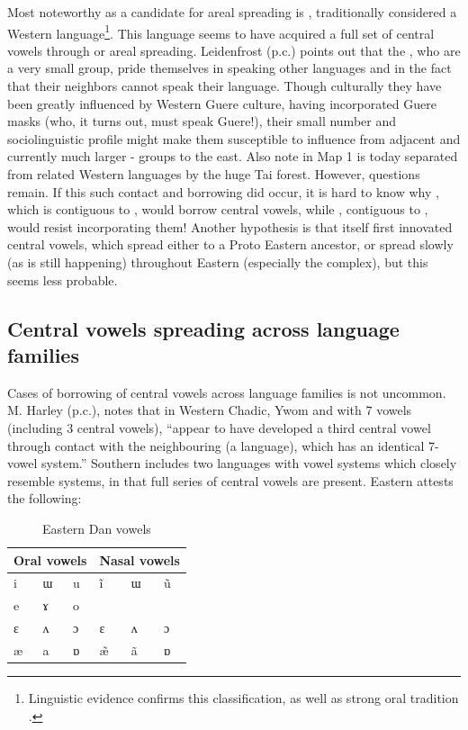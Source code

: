 \documentclass[output=paper
,newtxmath
,modfonts
,nonflat]{langsci/langscibook}
\begin{document}
Most noteworthy as a candidate for areal spreading is , traditionally considered a Western  language\footnote{Linguistic evidence confirms this classification, as well as strong oral tradition \citep{centredetraduction2013}.}. This language seems to have acquired a full set of central vowels through  or areal spreading.  Leidenfrost (p.c.) points out that the , who are a very small group, pride themselves in speaking other languages and in the fact that their neighbors cannot speak their language.  Though culturally they have been greatly influenced by Western Guere culture, having incorporated Guere masks (who, it turns out, must speak Guere!), their small number and sociolinguistic profile might make them susceptible to influence from adjacent and currently much larger -  groups to the east. Also note in Map 1  is today separated from related Western languages by the huge Tai forest. However, questions remain. If this such contact and borrowing did occur, it is hard to know why , which is contiguous to , would borrow central vowels, while , contiguous to , would resist incorporating them! Another hypothesis is that  itself first innovated central vowels, which spread either to a Proto Eastern  ancestor, or spread slowly (as is still happening) throughout Eastern  (especially the  complex), but this seems less probable.   

\subsection{Central vowels spreading across language families}\label{sec:zogbo:5.2} 

Cases of borrowing of central vowels across language families is not uncommon. M. Harley (p.c.), notes that in Western Chadic, Ywom and  with 7 vowels (including 3 central vowels), “appear to have developed a third central vowel through contact with the neighbouring  (a  language), which has an identical 7-vowel system.”  Southern  includes two  languages with vowel systems which closely resemble  systems, in that full series of central vowels are present. Eastern  attests the following: 

\begin{table}
\caption{Eastern Dan vowels \citep{Vydrine2009}}
\label{tab:zogbo:24}
\begin{tabular}{llp{2cm}lll}
\multicolumn{3}{l}{Oral vowels} &     \multicolumn{3}{l}{Nasal vowels}\\
\midrule
i & ɯ & u  &  ĩ & ɯ & ũ\\

e & ɤ & o\\

ɛ & ʌ & ɔ  &  ɛ & ʌ & ɔ\\

æ & a & ɒ  &  \~{æ} & ã & ɒ
\end{tabular}
\end{table}
\end{document}
